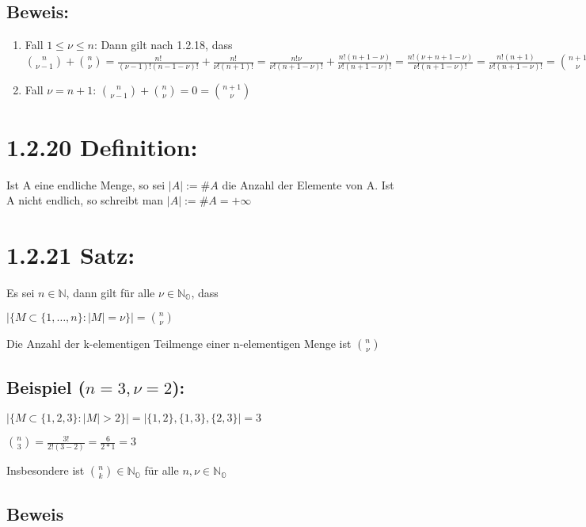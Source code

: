 \documentclass[11pt]{scrartcl}
\begin{document}
\subsection*{Beweis:}
\begin{enumerate}
	\item Fall $1 \leqslant \nu \leqslant n$:
	Dann gilt nach 1.2.18, dass
	${n \choose \nu -1} + {n \choose \nu} = 
	{\frac{n!}{(\nu -1)! (n-1-\nu)!}}+{\frac{n!}{\nu!(n+1)!}} = 
	{\frac{n!\nu}{\nu!(n+1-\nu)!}}+{\frac{n!(n+1-\nu)}{\nu!(n+1-\nu)!}}=
	{\frac{n!(\nu+n+1-\nu)}{\nu!(n+1-\nu)!}}=
	{\frac{n!(n+1)}{\nu!(n+1-\nu)!}}={n+1\choose \nu}
	$
	\item Fall $\nu = n+1$:
	${n \choose \nu-1 }+{n \choose \nu}=0={n+1 \choose \nu }$
	
\end{enumerate}

\section{1.2.20 Definition:}
Ist A eine endliche Menge, so sei
$|A| := \#A$ die Anzahl der Elemente von A. Ist A nicht endlich, so schreibt man $|A| := \#A=+\infty$

\section{1.2.21 Satz:}
Es sei $n \in \mathbb{N}$, dann gilt für alle $\nu \in \mathbb{N_{O}}$, dass 
\begin{flushleft}
	$ |\{M \subset \{1,\dots,n\}: |M|= \nu \}| = {n \choose \nu}$ 
\end{flushleft}
Die Anzahl der k-elementigen Teilmenge einer n-elementigen Menge ist ${n \choose \nu}$
\subsection*{Beispiel ($n=3,\nu=2$):}
$|\{M \subset \{1,2,3\}:|M|>2\}|=|\{1,2\},\{1,3\},\{2,3\}|=3$
\begin{flushleft}
	${n \choose 3} = \frac{3!}{2!(3-2)}=\frac{6}{2*1}=3$
\end{flushleft}
Insbesondere ist ${n \choose k} \in \mathbb{N_{O}}$ für alle $n,\nu \in \mathbb{N_{O}} $
\subsection*{Beweis}
\end{document}
